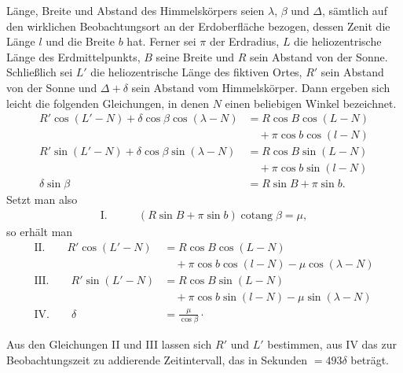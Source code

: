Länge, Breite und Abstand des Himmelskörpers seien $\lambda$, $\beta$ und $\Delta$, sämtlich auf den wirklichen Beobachtungsort an der Erdoberfläche bezogen, dessen Zenit die Länge $l$ und die Breite $b$ hat. Ferner sei $\pi$ der Erdradius, $L$ die heliozentrische Länge des Erdmittelpunkts, $B$ seine Breite und $R$ sein Abstand von der Sonne. Schließlich sei $L'$ die heliozentrische Länge des fiktiven Ortes, $R'$ sein Abstand von der Sonne und $\Delta+\delta$ sein Abstand vom Himmelskörper. Dann ergeben sich leicht die folgenden Gleichungen, in denen $N$ einen beliebigen Winkel bezeichnet.
\[
\begin{aligned}
R'\cos(L'-N)+\delta\cos\beta\cos(\lambda-N)
  &=R\cos B\cos(L-N)\\
  &\quad+\pi\cos b\cos(l-N)\\
R'\sin(L'-N)+\delta\cos\beta\sin(\lambda-N)
  &=R\cos B\sin(L-N)\\
  &\quad+\pi\cos b\sin(l-N)\\
\delta\sin\beta&=R\sin B+\pi\sin b.
\end{aligned}
\]
Setzt man also
\[
\begin{aligned}
\mathrm{I.}\qquad &(R\sin B+\pi\sin b)\operatorname{cotang}\beta=\mu,
\end{aligned}
\]
so erhält man
\[
\begin{aligned}
\mathrm{II.}\qquad R'\cos(L'-N)&=R\cos B\cos(L-N)\\
 &\quad+\pi\cos b\cos(l-N)-\mu\cos(\lambda-N)\\
\mathrm{III.}\qquad R'\sin(L'-N)&=R\cos B\sin(L-N)\\
 &\quad+\pi\cos b\sin(l-N)-\mu\sin(\lambda-N)\\
\mathrm{IV.}\qquad \delta&=\frac{\mu}{\cos\beta}\mathpunct{\cdot}
\end{aligned}
\]

Aus den Gleichungen II und III lassen sich $R'$ und $L'$ bestimmen, aus IV das zur Beobachtungszeit zu addierende Zeitintervall, das in Sekunden $=493\delta$ beträgt.

